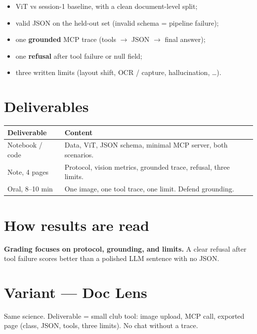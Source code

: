 \documentclass[11pt,a4paper]{article}
\begin{document}
\begin{itemize}
  \item ViT vs session-1 baseline, with a clean document-level split;
  \item valid JSON on the held-out set (invalid schema = pipeline failure);
  \item one \textbf{grounded} MCP trace (tools $\rightarrow$ JSON $\rightarrow$ final answer);
  \item one \textbf{refusal} after tool failure or null field;
  \item three written limits (layout shift, OCR / capture, hallucination, \ldots).
\end{itemize}

\section{Deliverables}

\begin{center}
\renewcommand{\arraystretch}{1.25}
\begin{tabular}{@{}p{3.2cm}p{11.4cm}@{}}
\toprule
\textbf{Deliverable} & \textbf{Content} \\
\midrule
Notebook / code & Data, ViT, JSON schema, minimal MCP server, both scenarios. \\
Note, 4 pages & Protocol, vision metrics, grounded trace, refusal, three limits. \\
Oral, 8--10 min & One image, one tool trace, one limit. Defend grounding. \\
\bottomrule
\end{tabular}
\end{center}

\section{How results are read}

{\color{warn}\textbf{Grading focuses on protocol, grounding, and limits.}}
A clear refusal after tool failure scores better than a polished LLM sentence
with no JSON.

\section{Variant --- Doc Lens}

Same science. Deliverable = small club tool: image upload, MCP call,
exported page (class, JSON, tools, three limits). No chat without a trace.
\end{document}
